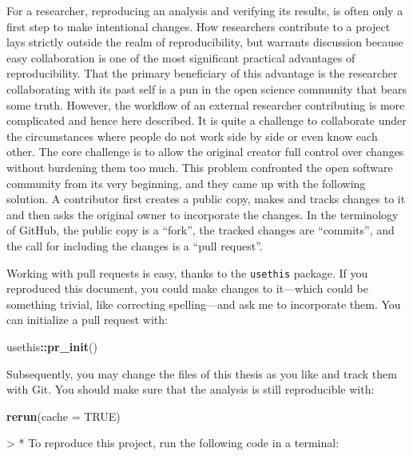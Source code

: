 \documentclass[12pt,a4paper,twoside]{article}
\newenvironment{Shaded}{\begin{snugshade}}{\end{snugshade}}
\newcommand{\DataTypeTok}[1]{\textcolor[rgb]{0.13,0.29,0.53}{#1}}
\newcommand{\KeywordTok}[1]{\textcolor[rgb]{0.13,0.29,0.53}{\textbf{#1}}}
\newcommand{\NormalTok}[1]{#1}
\newcommand{\OperatorTok}[1]{\textcolor[rgb]{0.81,0.36,0.00}{\textbf{#1}}}
\newcommand{\OtherTok}[1]{\textcolor[rgb]{0.56,0.35,0.01}{#1}}
\let\oldverbatim\verbatim
\let\endoldverbatim\endverbatim
\renewenvironment{verbatim}{\footnotesize\oldverbatim}{\endoldverbatim}
\begin{document}
For a researcher, reproducing an analysis and verifying its results, is often only a first step to make intentional changes.
How researchers contribute to a project lays strictly outside the realm of reproducibility, but warrants discussion because easy collaboration is one of the most significant practical advantages of reproducibility.
That the primary beneficiary of this advantage is the researcher collaborating with its past self is a pun in the open science community that bears some truth.
However, the workflow of an external researcher contributing is more complicated and hence here described.
It is quite a challenge to collaborate under the circumstances where people do not work side by side or even know each other.
The core challenge is to allow the original creator full control over changes without burdening them too much.
This problem confronted the open software community from its very beginning, and they came up with the following solution.
A contributor first creates a public copy, makes and tracks changes to it and then asks the original owner to incorporate the changes.
In the terminology of GitHub, the public copy is a ``fork'', the tracked changes are ``commits'', and the call for including the changes is a ``pull request''.

Working with pull requests is easy, thanks to the \texttt{usethis} package.
If you reproduced this document, you could make changes to it---which could be something trivial, like correcting spelling---and ask me to incorporate them.
You can initialize a pull request with:

\begin{Shaded}
\begin{Highlighting}[]
\NormalTok{usethis}\OperatorTok{::}\KeywordTok{pr_init}\NormalTok{()}
\end{Highlighting}
\end{Shaded}

Subsequently, you may change the files of this thesis as you like and track them with Git.
You should make sure that the analysis is still reproducible with:

\begin{Shaded}
\begin{Highlighting}[]
\KeywordTok{rerun}\NormalTok{(}\DataTypeTok{cache =} \OtherTok{TRUE}\NormalTok{)}
\end{Highlighting}
\end{Shaded}

\begin{verbatim}
> * To reproduce this project, run the following code in a terminal:
\end{verbatim}
\end{document}
